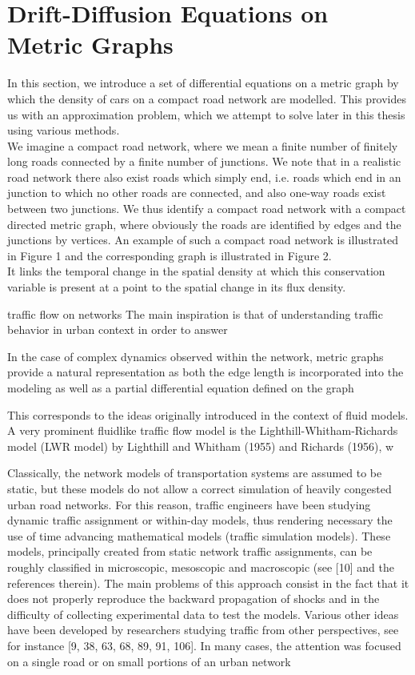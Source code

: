 \section{Drift-Diffusion Equations on Metric Graphs}
\label{ch1:sec2}

In this section, we introduce a set of differential equations on a metric graph by which the density of cars on a compact road network are modelled. This provides us with an approximation problem, which we attempt to solve later in this thesis using various methods. \\
We imagine a compact road network, where we mean a finite number of finitely long roads connected by a finite number of junctions. We note that in a realistic road network there also exist roads which simply end, i.e. roads which end in an junction to which no other roads are connected, and also one-way roads exist between two junctions. We thus identify a compact road network with a compact directed metric graph, where obviously the roads are identified by edges and the junctions by vertices. An example of such a compact road network is illustrated in Figure 1 and the corresponding graph is illustrated in Figure 2. \\



It links the temporal change in the spatial density at which this conservation variable is present at a point to the spatial change in its flux density.

traffic flow on networks The main inspiration is that of understanding traffic behavior in urban context in order to answer

In the case of complex dynamics observed within the network, metric graphs provide a natural representation as both the edge length is incorporated into the modeling as well as a partial differential equation defined on the graph

This corresponds to the ideas originally introduced in the context of fluid models. A very prominent fluidlike traffic flow model is the Lighthill-Whitham-Richards model (LWR model) by Lighthill and Whitham (1955) and Richards (1956), w

Classically, the network models of transportation systems are assumed to be static, but these models do not allow a correct simulation of heavily congested urban road networks. For this reason, traffic engineers have been studying dynamic traffic assignment or within-day models, thus rendering necessary the use of time advancing mathematical models (traffic simulation models). These models, principally created from static network traffic assignments, can be roughly classified in microscopic, mesoscopic and macroscopic (see [10] and the references therein). The main problems of this approach consist in the fact that it does not properly reproduce the backward propagation of shocks and in the difficulty of collecting experimental data to test the models. Various other ideas have been developed by researchers studying traffic from other perspectives, see for instance [9, 38, 63, 68, 89, 91, 106]. In many cases, the attention was focused on a single road or on small portions of an urban network

